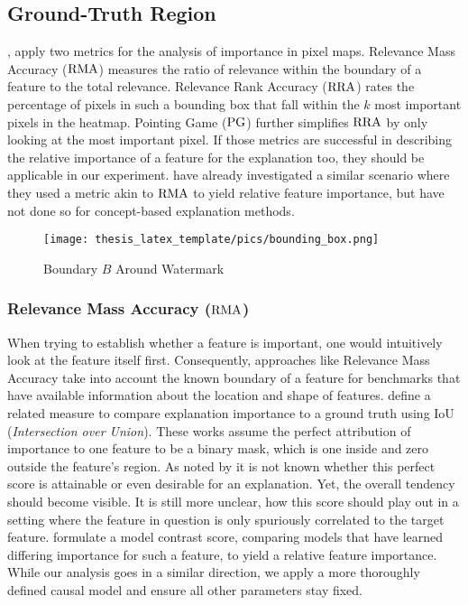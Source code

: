 \subsection{Ground-Truth Region}\label{section:region_specific}
\citet{Arras2022}, apply two metrics for the analysis of importance in pixel maps. Relevance Mass Accuracy ($\operatorname*{RMA}$) measures the ratio of relevance within the boundary of a feature to the total relevance. Relevance Rank Accuracy ($\operatorname*{RRA}$) rates the percentage of pixels in such a bounding box that fall within the $k$ most important pixels in the heatmap. Pointing Game ($\operatorname*{PG}$) further simplifies $\operatorname*{RRA}$ by only looking at the most important pixel. If those metrics are successful in describing the relative importance of a feature for the explanation too, they should be applicable in our experiment. \cite{Yang2019} have already investigated a similar scenario where they used a metric akin to $\operatorname*{RMA}$ to yield relative feature importance, but have not done so for concept-based explanation methods.
\begin{figure}[t!]
    \centering
        \texttt{[image: thesis\_latex\_template/pics/bounding\_box.png]}
\caption{Boundary $B$ Around Watermark}
\label{fig:bounding_box}
\end{figure}

\subsubsection{Relevance Mass Accuracy ($\operatorname*{RMA}$)}
When trying to establish whether a feature is important, one would intuitively look at the feature itself first. Consequently, approaches like Relevance Mass Accuracy take into account the known boundary of a feature for benchmarks that have available information about the location and shape of features.
\citet{Bau2017} define a related measure to compare explanation importance to a ground truth using IoU (\textit{Intersection over Union}). These works assume the perfect attribution of importance to one feature to be a binary mask, which is one inside and zero outside the feature's region.
As noted by \citet{Arras2022} it is not known whether this perfect score is attainable or even desirable for an explanation. Yet, the overall tendency should become visible. It is still more unclear, how this score should play out in a setting where the feature in question is only spuriously correlated to the target feature. \citet{Yang2019} formulate a model contrast score, comparing models that have learned differing importance for such a feature, to yield a relative feature importance. While our analysis goes in a similar direction, we apply a more thoroughly defined causal model and ensure all other parameters stay fixed. 

